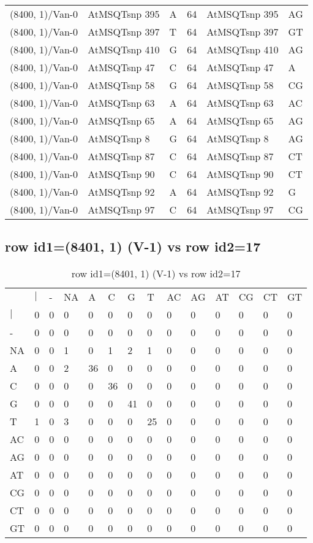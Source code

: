 \begin{center}
\begin{longtable}{|l|l|l|l|l|l|}
(8400, 1)/Van-0&AtMSQTsnp 395&A&64&AtMSQTsnp 395&AG\\
(8400, 1)/Van-0&AtMSQTsnp 397&T&64&AtMSQTsnp 397&GT\\
(8400, 1)/Van-0&AtMSQTsnp 410&G&64&AtMSQTsnp 410&AG\\
(8400, 1)/Van-0&AtMSQTsnp 47&C&64&AtMSQTsnp 47&A\\
(8400, 1)/Van-0&AtMSQTsnp 58&G&64&AtMSQTsnp 58&CG\\
(8400, 1)/Van-0&AtMSQTsnp 63&A&64&AtMSQTsnp 63&AC\\
(8400, 1)/Van-0&AtMSQTsnp 65&A&64&AtMSQTsnp 65&AG\\
(8400, 1)/Van-0&AtMSQTsnp 8&G&64&AtMSQTsnp 8&AG\\
(8400, 1)/Van-0&AtMSQTsnp 87&C&64&AtMSQTsnp 87&CT\\
(8400, 1)/Van-0&AtMSQTsnp 90&C&64&AtMSQTsnp 90&CT\\
(8400, 1)/Van-0&AtMSQTsnp 92&A&64&AtMSQTsnp 92&G\\
(8400, 1)/Van-0&AtMSQTsnp 97&C&64&AtMSQTsnp 97&CG\\
\hline
\end{longtable}
\end{center}

\subsection{row id1=(8401, 1) (V-1) vs row id2=17}
\begin{center}
\begin{longtable}{|l|l|l|l|l|l|l|l|l|l|l|l|l|l|}
\caption{row id1=(8401, 1) (V-1) vs row id2=17} \label{table_dm462}\\
\hline
\\
\hline
&$|$&-&NA&A&C&G&T&AC&AG&AT&CG&CT&GT\\
$|$&0&0&0&0&0&0&0&0&0&0&0&0&0\\
-&0&0&0&0&0&0&0&0&0&0&0&0&0\\
NA&0&0&1&0&1&2&1&0&0&0&0&0&0\\
A&0&0&2&36&0&0&0&0&0&0&0&0&0\\
C&0&0&0&0&36&0&0&0&0&0&0&0&0\\
G&0&0&0&0&0&41&0&0&0&0&0&0&0\\
T&1&0&3&0&0&0&25&0&0&0&0&0&0\\
AC&0&0&0&0&0&0&0&0&0&0&0&0&0\\
AG&0&0&0&0&0&0&0&0&0&0&0&0&0\\
AT&0&0&0&0&0&0&0&0&0&0&0&0&0\\
CG&0&0&0&0&0&0&0&0&0&0&0&0&0\\
CT&0&0&0&0&0&0&0&0&0&0&0&0&0\\
GT&0&0&0&0&0&0&0&0&0&0&0&0&0\\
\hline
\end{longtable}
\end{center}

